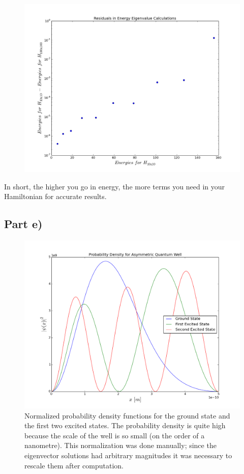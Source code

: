 \documentclass[a4paper,12pt]{article}
\begin{document}
\begin{figure}[H]
\centering
\includegraphics[width = \linewidth]{lab4q2d.png}
\caption{}
\label{fig:q2d}
\end{figure}

In short, the higher you go in energy, the more terms you need in your Hamiltonian for accurate results.

\subsection{Part e)}

\begin{figure}[H]
\centering
\includegraphics[width = \linewidth]{lab4q2ef.png}
\caption{Normalized probability density functions for the ground state and the first two excited states. The probability density is quite high because the scale of the well is so small (on the order of a nanometre). This normalization was done manually; since the eigenvector solutions had arbitrary magnitudes it was necessary to rescale them after computation.}
\label{fig:q2ei}
\end{figure}
\end{document}
